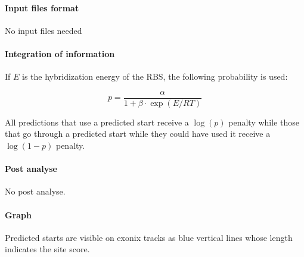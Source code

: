 \paragraph{Input files format} No input files needed

\paragraph{Integration of information}

If $E$ is the hybridization energy of the RBS, the following probability is used:

  \[p=\frac{\alpha}{1+\beta\cdot\exp(E/RT)}\]

All predictions that use a predicted start receive a $\log(p)$
penalty while those that go through a predicted start while they
could have used it receive a $\log(1-p)$ penalty.

\paragraph{Post analyse}

No post analyse.

\paragraph{Graph}

Predicted starts are visible on exonix tracks as blue vertical lines
whose length indicates the site score.

